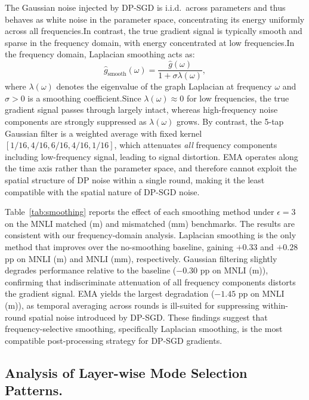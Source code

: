 The Gaussian noise injected by DP-SGD is i.i.d.\ across parameters and thus behaves as white noise in the parameter space, concentrating its energy uniformly across all frequencies.In contrast, the true gradient signal is typically smooth and sparse in the frequency domain, with energy concentrated at low frequencies.In the frequency domain, Laplacian smoothing acts as:
\begin{equation}
    \hat{g}_{\mathrm{smooth}}(\omega) 
    = \frac{\hat{g}(\omega)}{1 + \sigma \lambda(\omega)},
    \label{eq:laplacian_freq}
\end{equation}
where $\lambda(\omega)$ denotes the eigenvalue of the graph Laplacian at frequency $\omega$ and $\sigma > 0$ is a smoothing coefficient.Since $\lambda(\omega) \approx 0$ for low frequencies, the true gradient signal passes through largely intact, whereas high-frequency noise components are strongly suppressed as $\lambda(\omega)$ grows. By contrast, the 5-tap Gaussian filter is a weighted average with fixed kernel $[1/16, 4/16, 6/16, 4/16, 1/16]$, which attenuates \emph{all} frequency components including low-frequency signal, leading to signal distortion. EMA operates along the time axis rather than the parameter space, and therefore cannot exploit the spatial structure of DP noise within a single round, making it the least compatible with the spatial nature of DP-SGD noise.

Table~\ref{tab:smoothing} reports the effect of each smoothing method under $\epsilon = 3$ on the MNLI matched (m) and mismatched (mm) benchmarks. The results are consistent with our frequency-domain analysis. Laplacian smoothing is the only method that improves over the no-smoothing baseline, gaining $+0.33$ and $+0.28$ pp on MNLI (m) and MNLI (mm), respectively.
Gaussian filtering slightly degrades performance relative to the baseline ($-0.30$ pp on MNLI (m)), confirming that indiscriminate attenuation of all frequency components distorts the gradient signal. EMA yields the largest degradation ($-1.45$ pp on MNLI (m)), as temporal averaging across rounds is ill-suited for suppressing within-round spatial noise introduced by DP-SGD. These findings suggest that frequency-selective smoothing, specifically Laplacian smoothing, is the most compatible post-processing strategy for DP-SGD gradients.



\subsection{Analysis of Layer-wise Mode Selection Patterns.} \label{app:mode_selection}

